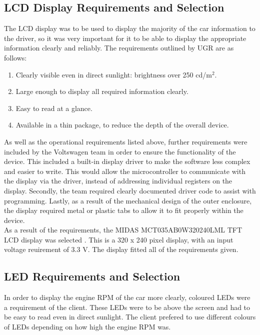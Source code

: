 \documentclass[a4paper,12pt]{article}
\begin{document}
\subsection{LCD Display Requirements and Selection}
\label{sec:display}

The LCD display was to be used to display the majority of the car information to the driver, so it was very important for it to be able to display the appropriate information clearly and reliably. The requirements outlined by UGR are as follows:

\begin{enumerate}
  \item Clearly visible even in direct sunlight: brightness over 250 cd/$\textrm{m}^2$.
  \item Large enough to display all required information clearly.
  \item Easy to read at a glance.
  \item Available in a thin package, to reduce the depth of the overall device.
\end{enumerate}

As well as the operational requirements listed above, further requirements were included by the Voltswagen team in order to ensure the functionality of the device. This included a built-in display driver to make the software less complex and easier to write. This would allow the microcontroller to communicate with the display via the driver, instead of addressing individual registers on the display. Secondly, the team required clearly documented driver code to assist with programming. Lastly, as a result of the mechanical design of the outer enclosure, the display required metal or plastic tabs to allow it to fit properly within the device. \\

As a result of the requirements, the MIDAS MCT035AB0W320240LML TFT LCD display was selected \cite{display_datasheet}. This is a 320 x 240 pixel display, with an input voltage reuirement of 3.3 V. The display fitted all of the requirements given.

\subsection{LED Requirements and Selection}
\label{sec:LEDs}

In order to display the engine RPM of the car more clearly, coloured LEDs were a requirement of the client. These LEDs were to be above the screen and had to be easy to read even in direct sunlight. The client prefered to use different colours of LEDs depending on how high the engine RPM was. \\
\end{document}
